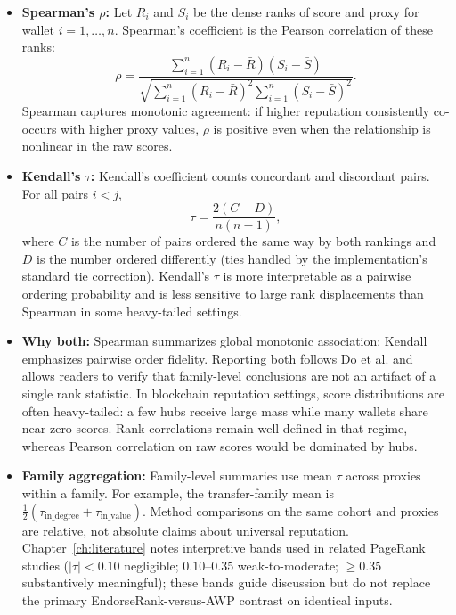 \begin{itemize}
\item \textbf{Spearman's $\rho$:} Let $R_i$ and $S_i$ be the dense ranks of score and proxy for wallet $i=1,\ldots,n$. Spearman's coefficient is the Pearson correlation of these ranks:
\begin{equation}
\label{eq:spearman-ops}
\rho
=
\frac{\sum_{i=1}^{n}(R_i-\bar R)(S_i-\bar S)}
{\sqrt{\sum_{i=1}^{n}(R_i-\bar R)^2\sum_{i=1}^{n}(S_i-\bar S)^2}}.
\end{equation}
Spearman captures monotonic agreement: if higher reputation consistently co-occurs with higher proxy values, $\rho$ is positive even when the relationship is nonlinear in the raw scores.

\item \textbf{Kendall's $\tau$:} Kendall's coefficient counts concordant and discordant pairs. For all pairs $i<j$,
\begin{equation}
\label{eq:kendall-ops}
\tau
=
\frac{2(C-D)}{n(n-1)},
\end{equation}
where $C$ is the number of pairs ordered the same way by both rankings and $D$ is the number ordered differently (ties handled by the implementation's standard tie correction). Kendall's $\tau$ is more interpretable as a pairwise ordering probability and is less sensitive to large rank displacements than Spearman in some heavy-tailed settings.

\item \textbf{Why both:} Spearman summarizes global monotonic association; Kendall emphasizes pairwise order fidelity. Reporting both follows Do et al. and allows readers to verify that family-level conclusions are not an artifact of a single rank statistic. In blockchain reputation settings, score distributions are often heavy-tailed: a few hubs receive large mass while many wallets share near-zero scores. Rank correlations remain well-defined in that regime, whereas Pearson correlation on raw scores would be dominated by hubs.

\item \textbf{Family aggregation:} Family-level summaries use mean $\tau$ across proxies within a family. For example, the transfer-family mean is $\tfrac{1}{2}(\tau_{\mathrm{in\_degree}}+\tau_{\mathrm{in\_value}})$. Method comparisons on the same cohort and proxies are relative, not absolute claims about universal reputation. Chapter~\ref{ch:literature} notes interpretive bands used in related PageRank studies ($|\tau|<0.10$ negligible; $0.10$--$0.35$ weak-to-moderate; $\geq 0.35$ substantively meaningful); these bands guide discussion but do not replace the primary EndorseRank-versus-AWP contrast on identical inputs.


\end{itemize}
